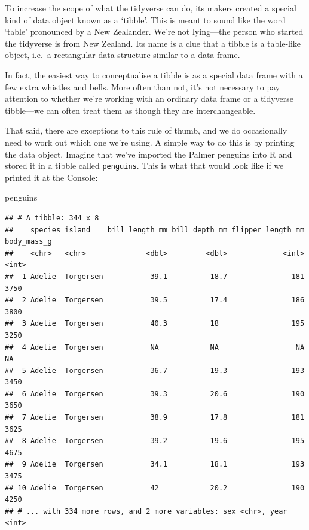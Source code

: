 \documentclass[
]{book}
\newenvironment{Shaded}{\begin{snugshade}}{\end{snugshade}}
\newcommand{\NormalTok}[1]{#1}
\begin{document}
To increase the scope of what the tidyverse can do, its makers created a special kind of data object known as a `tibble'. This is meant to sound like the word `table' pronounced by a New Zealander. We're not lying---the person who started the tidyverse is from New Zealand. Its name is a clue that a tibble is a table-like object, i.e.~a rectangular data structure similar to a data frame.

In fact, the easiest way to conceptualise a tibble is as a special data frame with a few extra whistles and bells. More often than not, it's not necessary to pay attention to whether we're working with an ordinary data frame or a tidyverse tibble---we can often treat them as though they are interchangeable.

That said, there are exceptions to this rule of thumb, and we do occasionally need to work out which one we're using. A simple way to do this is by printing the data object. Imagine that we've imported the Palmer penguins into R and stored it in a tibble called \texttt{penguins}. This is what that would look like if we printed it at the Console:

\begin{Shaded}
\begin{Highlighting}[]
\NormalTok{penguins}
\end{Highlighting}
\end{Shaded}

\begin{verbatim}
## # A tibble: 344 x 8
##    species island    bill_length_mm bill_depth_mm flipper_length_mm body_mass_g
##    <chr>   <chr>              <dbl>         <dbl>             <int>       <int>
##  1 Adelie  Torgersen           39.1          18.7               181        3750
##  2 Adelie  Torgersen           39.5          17.4               186        3800
##  3 Adelie  Torgersen           40.3          18                 195        3250
##  4 Adelie  Torgersen           NA            NA                  NA          NA
##  5 Adelie  Torgersen           36.7          19.3               193        3450
##  6 Adelie  Torgersen           39.3          20.6               190        3650
##  7 Adelie  Torgersen           38.9          17.8               181        3625
##  8 Adelie  Torgersen           39.2          19.6               195        4675
##  9 Adelie  Torgersen           34.1          18.1               193        3475
## 10 Adelie  Torgersen           42            20.2               190        4250
## # ... with 334 more rows, and 2 more variables: sex <chr>, year <int>
\end{verbatim}
\end{document}
